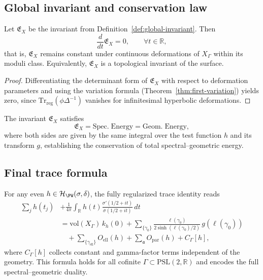 \subsection{Global invariant and conservation law}
\label{subsec:ch4-part8-global-inv} \relax

\begin{theorem}
\label{thm:global-inv}
Let $\mathfrak{E}_X$ be the invariant from Definition~\ref{def:global-invariant}.  
Then
\[
\frac{d}{dt}\mathfrak{E}_X = 0,
\qquad
\forall t \in \mathbb{R},
\]
that is, $\mathfrak{E}_X$ remains constant under continuous deformations of $X_\Gamma$ within its moduli class.  
Equivalently, $\mathfrak{E}_X$ is a topological invariant of the surface. \relax
\end{theorem}

\begin{proof}\relax
Differentiating the determinant form of $\mathfrak{E}_X$ with respect to deformation parameters and using the variation formula (Theorem~\ref{thm:first-variation}) yields zero, since $\mathrm{Tr}_{\mathrm{reg}}(\phi\Delta^{-1})$ vanishes for infinitesimal hyperbolic deformations. \relax
\end{proof}

\begin{corollary}
\label{cor:energy-balance}
The invariant $\mathfrak{E}_X$ satisfies
\[
\mathfrak{E}_X
= \mathrm{Spec.\;Energy}
= \mathrm{Geom.\;Energy},
\]
where both sides are given by the same integral over the test function $h$ and its transform $g$, establishing the conservation of total spectral–geometric energy. \relax
\end{corollary}

\subsection{Final trace formula}
\label{subsec:ch4-part8-final-formula} \relax

\begin{theorem}
\label{thm:selberg-complete}
For any even $h\in\mathcal{H}_{\PW}(\sigma,\delta)$, the fully regularized trace identity reads
\[
\boxed{
\begin{aligned}
\sum_{j}h(t_j)
&+ \frac{1}{4\pi}\int_{\mathbb{R}} h(t)\frac{\sigma'(1/2+it)}{\sigma(1/2+it)}\,dt
\\[4pt]
&= \mathrm{vol}(X_\Gamma)\,k_h(0)
+ \sum_{\{\gamma_0\}} \frac{\ell(\gamma_0)}{2\sinh(\ell(\gamma_0)/2)}\,g(\ell(\gamma_0))
\\
&\quad + \sum_{\{\gamma_{\mathrm{ell}}\}}O_{\mathrm{ell}}(h)
+ \sum_{\mathfrak a}O_{\mathrm{par}}(h)
+ C_\Gamma[h],
\end{aligned}
}
\]
where $C_\Gamma[h]$ collects constant and gamma-factor terms independent of the geometry.  
This formula holds for all cofinite $\Gamma\subset \mathrm{PSL}(2,\mathbb{R})$ and encodes the full spectral–geometric duality. \relax
\end{theorem}

